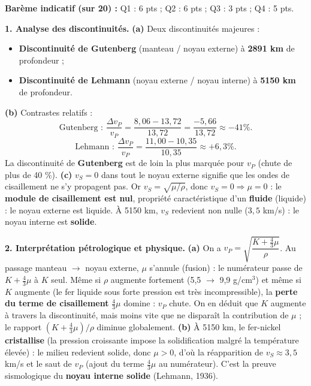 \documentclass[11pt]{article}
\begin{document}
\begin{corrige}
\textbf{Barème indicatif (sur 20) :} Q1 : 6 pts ; Q2 : 6 pts ; Q3 : 3 pts ; Q4 : 5 pts.

\textbf{1. Analyse des discontinuités.}
\textbf{(a)} Deux discontinuités majeures :
\begin{itemize}
    \item \textbf{Discontinuité de Gutenberg} (manteau / noyau externe) à \textbf{2891 km} de profondeur ;
    \item \textbf{Discontinuité de Lehmann} (noyau externe / noyau interne) à \textbf{5150 km} de profondeur.
\end{itemize}
\textbf{(b)} Contrastes relatifs :
\[ \text{Gutenberg : } \frac{\Delta v_P}{v_P} = \frac{8{,}06 - 13{,}72}{13{,}72} = \frac{-5{,}66}{13{,}72} \approx -41\%. \]
\[ \text{Lehmann : } \frac{\Delta v_P}{v_P} = \frac{11{,}00 - 10{,}35}{10{,}35} \approx +6{,}3\%. \]
La discontinuité de \textbf{Gutenberg} est de loin la plus marquée pour $v_P$ (chute de plus de 40 \%).
\textbf{(c)} $v_S = 0$ dans tout le noyau externe signifie que les ondes de cisaillement ne s'y propagent pas. Or $v_S = \sqrt{\mu/\rho}$, donc $v_S = 0 \Rightarrow \mu = 0$ : le \textbf{module de cisaillement est nul}, propriété caractéristique d'un \textbf{fluide} (liquide) : le noyau externe est liquide. À 5150 km, $v_S$ redevient non nulle ($3,5$ km/s) : le noyau interne est \textbf{solide}.

\textbf{2. Interprétation pétrologique et physique.}
\textbf{(a)} On a $v_P = \sqrt{\dfrac{K + \frac{4}{3}\mu}{\rho}}$. Au passage manteau $\to$ noyau externe, $\mu$ s'annule (fusion) : le numérateur passe de $K + \frac{4}{3}\mu$ à $K$ seul. Même si $\rho$ augmente fortement (5,5 $\to$ 9,9 g/cm$^3$) et même si $K$ augmente (le fer liquide sous forte pression est très incompressible), la \textbf{perte du terme de cisaillement} $\frac{4}{3}\mu$ domine : $v_P$ chute. On en déduit que $K$ augmente à travers la discontinuité, mais moins vite que ne disparaît la contribution de $\mu$ ; le rapport $(K + \frac{4}{3}\mu)/\rho$ diminue globalement.
\textbf{(b)} À 5150 km, le fer-nickel \textbf{cristallise} (la pression croissante impose la solidification malgré la température élevée) : le milieu redevient solide, donc $\mu > 0$, d'où la réapparition de $v_S \approx 3,5$ km/s et le saut de $v_P$ (ajout du terme $\frac{4}{3}\mu$ au numérateur). C'est la preuve sismologique du \textbf{noyau interne solide} (Lehmann, 1936).


\end{corrige}
\end{document}
